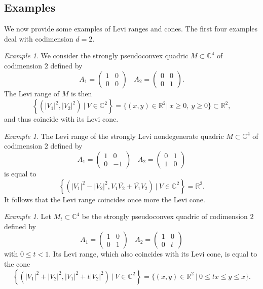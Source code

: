 \documentclass[12pt]{amsart}
\newcommand{\C}{\mathbb C}
\newcommand{\R}{\mathbb R}
\theoremstyle{remark}
\theoremstyle{example}
\newtheorem{example}[theo]{Example}
\theoremstyle{definition}
\numberwithin{equation}{section}
\begin{document}
\subsection{Examples}

We now provide some examples of Levi ranges and cones. The first four examples deal with codimension $d=2$.		
	
\begin{example}\label{excorner}
We consider the strongly pseudoconvex quadric $M\subset \C^4$ of codimension $2$ defined by   
$$A_1=
\begin{pmatrix}
	1& 0 \\ 0 &0 
\end{pmatrix} \ \ \ \ A_2=
\begin{pmatrix}
	0& 0 \\ 0 &1 
\end{pmatrix}.$$
The Levi range of $M$ is then
 $$\left\{\left(|V_1|^2,|V_2|^2\right) \ | \ V\in \C^2 \right\}=\{(x,y) \in \R^2 |  \ x\geq 0, \ y\geq 0\}\subset \R^2,$$
 and thus coincide with its Levi cone.
\end{example}  


\begin{example}\label{ex2pi}
 The Levi range of the strongly Levi nondegenerate quadric $M\subset \C^4$ of codimension $2$ defined by   
$$A_1=
\begin{pmatrix}
	1& 0 \\ 0 &-1 
\end{pmatrix} \ \ \ \ A_2=
\begin{pmatrix}
	0& 1 \\ 1 &0 
\end{pmatrix}$$
is equal to
$$\left\{\left(|V_1|^2-|V_2|^2,V_1\overline{V_2}+\overline{V_1}V_2\right) \ | \ V\in \C^2 \right\}=\R^2.$$
It follows that the Levi range coincides once more the  Levi cone.
\end{example}      


\begin{example}\label{exconet} Let $M_t\subset \C^4$ be the strongly pseudoconvex quadric of codimension $2$ defined by   
$$A_1=
\begin{pmatrix}
	1& 0 \\ 0 &1 
\end{pmatrix} \ \ \ \ A_2=
\begin{pmatrix}
	1& 0 \\ 0 & t
\end{pmatrix}$$
with $0\leq t<1$.  Its Levi range, which also coincides with its Levi cone, is equal to the cone 
$$\left\{\left(|V_1|^2+|V_2|^2,|V_1|^2+t|V_2|^2\right) \ | \ V\in \C^2 \right\}=\{(x,y) \in \R^2 \ | \  0 \leq t x \leq  y \leq x\}.$$
\end{example}      
\end{document}
